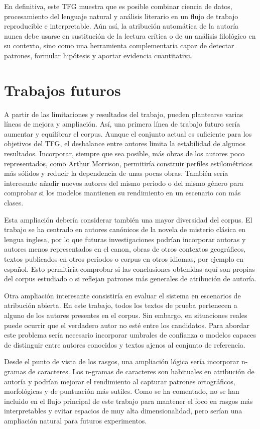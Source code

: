 \documentclass[IB]{TFUOC}%
\begin{document}
En definitiva, este TFG muestra que es posible combinar ciencia de datos, procesamiento del lenguaje natural y análisis literario en un flujo de trabajo reproducible e interpretable. Aún así, la atribución automática de la autoría nunca debe usarse en sustitución de la lectura crítica o de un análisis filológico en su contexto, sino como una herramienta complementaria capaz de detectar patrones, formular hipótesis y aportar evidencia cuantitativa.

\section{Trabajos futuros}

A partir de las limitaciones y resultados del trabajo, pueden plantearse varias líneas de mejora y ampliación. Así, una primera línea de trabajo futuro sería aumentar y equilibrar el corpus. Aunque el conjunto actual es suficiente para los objetivos del TFG, el desbalance entre autores limita la estabilidad de algunos resultados. Incorporar, siempre que sea posible, más obras de los autores poco representados, como Arthur Morrison, permitiría construir perfiles estilométricos más sólidos y reducir la dependencia de unas pocas obras. También sería interesante añadir nuevos autores del mismo periodo o del mismo género para comprobar si los modelos mantienen su rendimiento en un escenario con más clases.

Esta ampliación debería considerar también una mayor diversidad del corpus. El trabajo se ha centrado en autores canónicos de la novela de misterio clásica en lengua inglesa, por lo que futuras investigaciones podrían incorporar autoras y autores menos representados en el canon, obras de otros contextos geográficos, textos publicados en otros periodos o corpus en otros idiomas, por ejemplo en español. Esto permitiría comprobar si las conclusiones obtenidas aquí son propias del corpus estudiado o si reflejan patrones más generales de atribución de autoría.

Otra ampliación interesante consistiría en evaluar el sistema en escenarios de atribución abierta. En este trabajo, todos los textos de prueba pertenecen a alguno de los autores presentes en el corpus. Sin embargo, en situaciones reales puede ocurrir que el verdadero autor no esté entre los candidatos. Para abordar este problema sería necesario incorporar umbrales de confianza o modelos capaces de distinguir entre autores conocidos y textos ajenos al conjunto de referencia.

Desde el punto de vista de los rasgos, una ampliación lógica sería incorporar n-gramas de caracteres. Los n-gramas de caracteres son habituales en atribución de autoría y podrían mejorar el rendimiento al capturar patrones ortográficos, morfológicas y de puntuación más sutiles. Como se ha comentado, no se han incluido en el flujo principal de este trabajo para mantener el foco en rasgos más interpretables y evitar espacios de muy alta dimensionalidad, pero serían una ampliación natural para futuros experimentos.
\end{document}
